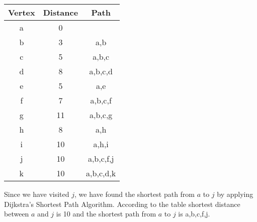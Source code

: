 \documentclass[11pt]{article}
\begin{document}
\begin{table}[H]
	\centering
	\vspace{5px}
	\begin{tabular}{|c|c|c|}
		\hline
		Vertex&Distance&Path \\ \hline
		a&0&\\ \hline
		b&3&a,b\\ \hline
		c&5&a,b,c\\ \hline
		d&8&a,b,c,d\\ \hline
		e&5&a,e \\ \hline
		f&7&a,b,c,f\\ \hline
		g&11&a,b,c,g\\ \hline
		h&8&a,h\\ \hline
		i&10&a,h,i\\ \hline
		j&10&a,b,c,f,j\\ \hline
		k&10&a,b,c,d,k\\ \hline
	\end{tabular}
\end{table}  
Since we have visited $j$, we have found the shortest path from $a$ to $j$ by applying Dijkstra's Shortest Path Algorithm. According to the table shortest distance between $a$ and $j$ is 10 and the shortest path from $a$ to $j$ is a,b,c,f,j.
\end{document}
